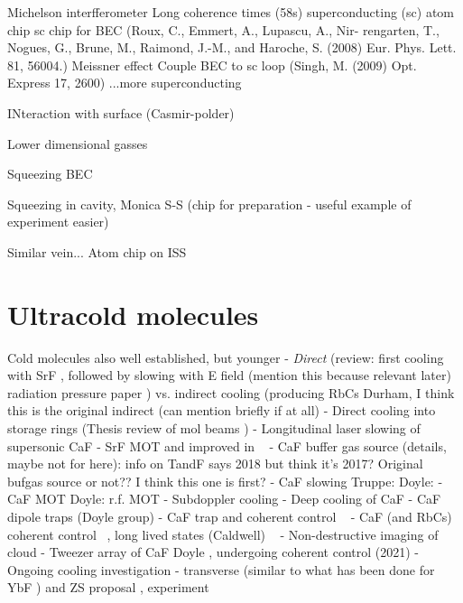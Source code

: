 Michelson interfferometer \cite{Wang2005}
Long coherence times (58s) \cite{Deutsch2010}
superconducting (sc) atom chip \cite{Nirrengarten2006}
sc chip for BEC
(Roux, C., Emmert, A., Lupascu, A., Nir- rengarten, T., Nogues, G., Brune, M.,
Raimond, J.-M., and Haroche, S. (2008) Eur. Phys. Lett. 81, 56004.)
Meissner effect \cite{Cano2008}
Couple BEC to sc loop (Singh, M. (2009) Opt. Express 17, 2600)
...more superconducting \cite{Bernon2013}

INteraction with surface (Casmir-polder)
\cite{PhysRevA.72.033610}
\cite{PhysRevLett.98.063201}


Lower dimensional gasses
\cite{PhysRevLett.116.030402}
\cite{Hofferberth2007}
\cite{Yuen2015}

Squeezing BEC
\cite{PhysRevLett.105.080403}

Squeezing in cavity, Monica S-S (chip for preparation - useful example of experiment
easier) \cite{PhysRevLett.104.073604}

Similar vein...  Atom chip on ISS \cite{Frye2021}

\section{Ultracold molecules}


Cold molecules also well established, but younger
- \emph{Direct} (review: \cite{Tarbutt2018} first cooling with SrF \cite{Shuman2009}, followed by
slowing with E field \cite{Bethlem1999} (mention this because relevant later)
radiation pressure paper \cite{PhysRevLett.108.103002}) vs. indirect cooling
(producing RbCs Durham\cite{PhysRevA.89.033604}, I think this is the original indirect \cite{Moses2017} (can mention briefly if at all)  
- Direct cooling into storage rings (Thesis \cite{Crompvoets2005} review of mol beams \cite{vandeMeerakker2012})
- Longitudinal laser slowing of supersonic CaF \cite{PhysRevA.89.053416}
- SrF MOT \cite{Barry2014} and improved in ~\cite{PhysRevLett.116.063004}
- CaF buffer gas source (details, maybe not for here): \cite{Truppe2018} %
info on TandF says 2018 but think it's 2017? Original bufgas source
\cite{Barry2011} or not?? I think this one is first? \cite{Maxwell2005}
- CaF slowing Truppe: \cite{Truppe2017a} Doyle: \cite{0953-4075-49-17-174001}
- CaF MOT Doyle: r.f. MOT \cite{PhysRevLett.119.103201}
- Subdoppler cooling \cite{Truppe2017}
- Deep cooling of CaF \cite{PhysRevLett.123.033202}
- CaF dipole traps (Doyle group)
- CaF trap and coherent control ~\cite{WilliamsMagnetic2018}
- CaF (and RbCs) coherent control ~\cite{Blackmore_2018}, long lived states
(Caldwell) ~\cite{PhysRevLett.124.063001}
- Non-destructive imaging of cloud \cite{PhysRevLett.121.083201}
- Tweezer array of CaF Doyle \cite{Anderegg2019}, undergoing coherent control
\cite{PhysRevLett.127.123202} (2021)
- Ongoing cooling investigation - transverse (similar to what has been done for
YbF \cite{Alauze2021}) and ZS proposal \cite{Fitch2016}, experiment \cite{PhysRevLett.127.263002}

